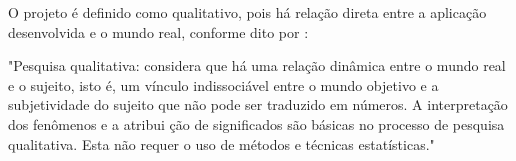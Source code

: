 O projeto é definido como qualitativo, pois há
relação direta entre a aplicação desenvolvida e
o mundo real, conforme dito por \cite{
    prodanov2013}:

\begin{fullcite}
    "Pesquisa qualitativa: considera que há uma
    relação dinâmica entre o mundo
    real e o sujeito, isto é, um vínculo
    indissociável entre o mundo objetivo
    e a subjetividade do sujeito que não pode
    ser traduzido em números.
    A interpretação dos fenômenos e a atribui
    ção de significados são básicas no processo
    de pesquisa qualitativa.
    Esta não requer o uso de métodos
    e técnicas estatísticas."\cite[p.~70]{
        prodanov2013}
\end{fullcite}


